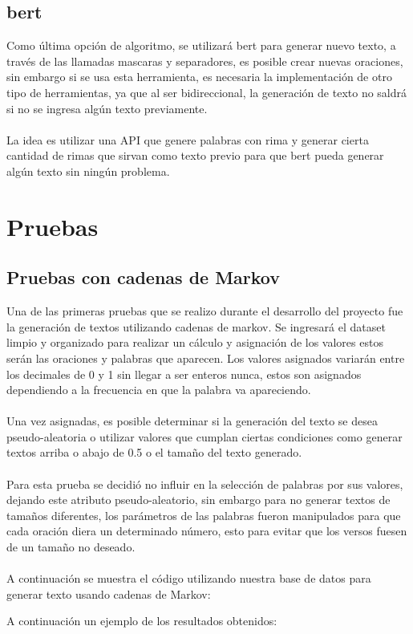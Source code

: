 \documentclass[12pt, a4paper, titlepage]{report}
\begin{document}
   		\subsection{\acrshort{bert}}
   		Como última opción de algoritmo, se utilizará \acrshort{bert} para generar nuevo texto, a través de las llamadas mascaras y separadores, es posible crear nuevas oraciones, sin embargo si se usa esta herramienta, es necesaria la implementación de otro tipo de herramientas, ya que al ser bidireccional, la generación de texto no saldrá si no se ingresa algún texto previamente.\\\\
   		La idea es utilizar una API que genere palabras con rima y generar cierta cantidad de rimas que sirvan como texto previo para que \acrshort{bert} pueda generar algún texto sin ningún problema.
   		 
	   	\section{Pruebas}
	   	
	   	\subsection{Pruebas con cadenas de Markov}
	   	Una de las primeras pruebas que se realizo durante el desarrollo del proyecto fue la generación de textos utilizando cadenas de markov.
	   	Se ingresará el dataset limpio y organizado para realizar un cálculo y asignación de los valores estos serán las oraciones y palabras que aparecen.
	   	Los valores asignados variarán entre los decimales de 0 y 1 sin llegar a ser enteros nunca, estos son asignados dependiendo a la frecuencia en que la palabra va apareciendo.\\\\
	   	Una vez asignadas, es posible determinar si la generación del texto se desea pseudo-aleatoria o utilizar valores que cumplan ciertas condiciones como generar textos arriba o abajo de 0.5 o el tamaño del texto generado.\\\\
	   	Para esta prueba se decidió no influir en la selección de palabras por sus valores, dejando este atributo pseudo-aleatorio, sin embargo para no generar textos de tamaños diferentes, los parámetros de las palabras fueron manipulados para que cada oración diera un determinado número, esto para evitar que los versos fuesen de un tamaño no deseado.\\\\
	   	A continuación se muestra el código utilizando nuestra base de datos para generar texto usando cadenas de Markov:
	   	\begin{center}
	   		
	   	\end{center}
   	\newpage
	   	A continuación un ejemplo de los resultados obtenidos:
	   	\begin{center}
	   				
	   	\end{center}
   	
\end{document}
